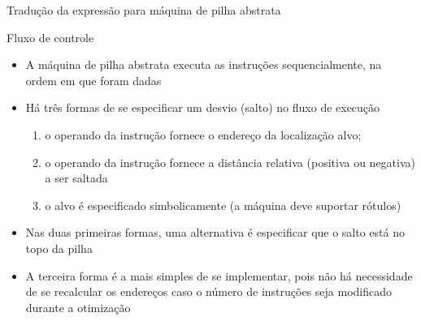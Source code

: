 \begin{frame}[fragile]{Tradução da expressão  para máquina de pilha abstrata}
\end{frame}

\begin{frame}[fragile]{Fluxo de controle}

    \begin{itemize}
        \item A máquina de pilha abstrata executa as instruções sequencialmente, na ordem em que foram dadas

        \item Há três formas de se especificar um desvio (salto) no fluxo de execução
        \begin{enumerate}
            \item o operando da instrução fornece o endereço da localização alvo;

            \item o operando da instrução fornece a distância relativa (positiva ou negativa) a ser saltada

            \item o alvo é especificado simbolicamente (a máquina deve suportar rótulos)
        \end{enumerate}

        \item Nas duas primeiras formas, uma alternativa é especificar que o salto está no topo da pilha

        \item A terceira forma é a mais simples de se implementar, pois não há necessidade de se recalcular os endereços caso o número de instruções seja
            modificado durante a otimização
    \end{itemize}

\end{frame}

